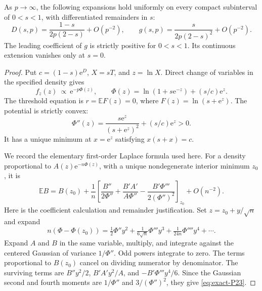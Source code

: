 \begin{proposition}\label{prop:exact-P7} As \(p\to\infty\), the following expansions hold uniformly on every compact subinterval of \(0<s<1\), with differentiated remainders in \(s\):
\begin{equation}
 D(s,p)=\frac{1-s}{2p(2-s)}+O(p^{-2}),\qquad
 g(s,p)=\frac{s}{2p(2-s)^2}+O(p^{-2}).                 \label{eq:exact-P22}
\end{equation}
The leading coefficient of \(g\) is strictly positive for \(0<s<1\). Its continuous extension vanishes only at \(s=0\).

\end{proposition}
\begin{proof} Put \(c=(1-s)\mathrm{e}^D\), \(X=sT\), and \(z=\ln X\). Direct change of variables in the specified density gives
\begin{equation}
 f_z(z)\ \propto\ \mathrm{e}^{-p\Phi(z)},\qquad
 \Phi(z)=\ln(1+s \mathrm{e}^{-z})+(s/c)\mathrm{e}^z.
\end{equation}
The threshold equation is \(r=\mathbb{E}F(z)=0\), where
\(F(z)=\ln(s+\mathrm{e}^z)\). The potential is strictly convex:
\begin{equation}
 \Phi''(z)=\frac{s \mathrm{e}^z}{(s+\mathrm{e}^z)^2}+(s/c)\mathrm{e}^z>0.
\end{equation}
It has a unique minimum at \(x=\mathrm{e}^z\) satisfying \(x(s+x)=c\).

We record the elementary first-order Laplace formula used here. For a density proportional to \(A(z)\mathrm{e}^{-n\Phi(z)}\), with a unique nondegenerate interior minimum \(z_0\), it is
\begin{equation}
 \mathbb{E}B=B(z_0)+\frac1n
 \left[\frac{B''}{2\Phi''}
       +\frac{B'A'}{A\Phi''}
       -\frac{B'\Phi'''}{2(\Phi'')^2}\right]_{z_0}
 +O(n^{-2}).                                        \label{eq:exact-P23}
\end{equation}
Here is the coefficient calculation and remainder justification. Set
\(z=z_0+y/\sqrt n\) and expand
\begin{equation}
 n(\Phi-\Phi(z_0))
 =\tfrac12\Phi''y^2+\tfrac1{6\sqrt n}\Phi'''y^3
   +\tfrac1{24n}\Phi''''y^4+\cdots.
\end{equation}
Expand \(A\) and \(B\) in the same variable, multiply, and integrate against the centered Gaussian of variance \(1/\Phi''\). Odd powers integrate to zero. The terms proportional to \(B(z_0)\) cancel on dividing numerator by denominator. The surviving terms are \(B''y^2/2\), \(B'A'y^2/A\), and \(-B'\Phi'''y^4/6\). Since the Gaussian second and fourth moments are \(1/\Phi''\) and \(3/(\Phi'')^2\), they give \eqref{eq:exact-P23}.


\end{proof}
